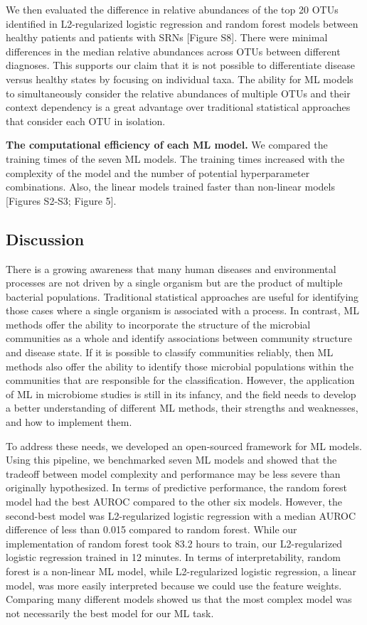 \documentclass[11pt,]{article}
\begin{document}
We then evaluated the difference in relative abundances of the top 20
OTUs identified in L2-regularized logistic regression and random forest
models between healthy patients and patients with SRNs {[}Figure S8{]}.
There were minimal differences in the median relative abundances across
OTUs between different diagnoses. This supports our claim that it is not
possible to differentiate disease versus healthy states by focusing on
individual taxa. The ability for ML models to simultaneously consider
the relative abundances of multiple OTUs and their context dependency is
a great advantage over traditional statistical approaches that consider
each OTU in isolation.

\textbf{The computational efficiency of each ML model.} We compared the
training times of the seven ML models. The training times increased with
the complexity of the model and the number of potential hyperparameter
combinations. Also, the linear models trained faster than non-linear
models {[}Figures S2-S3; Figure 5{]}.

\subsection{Discussion}\label{discussion}

There is a growing awareness that many human diseases and environmental
processes are not driven by a single organism but are the product of
multiple bacterial populations. Traditional statistical approaches are
useful for identifying those cases where a single organism is associated
with a process. In contrast, ML methods offer the ability to incorporate
the structure of the microbial communities as a whole and identify
associations between community structure and disease state. If it is
possible to classify communities reliably, then ML methods also offer
the ability to identify those microbial populations within the
communities that are responsible for the classification. However, the
application of ML in microbiome studies is still in its infancy, and the
field needs to develop a better understanding of different ML methods,
their strengths and weaknesses, and how to implement them.

To address these needs, we developed an open-sourced framework for ML
models. Using this pipeline, we benchmarked seven ML models and showed
that the tradeoff between model complexity and performance may be less
severe than originally hypothesized. In terms of predictive performance,
the random forest model had the best AUROC compared to the other six
models. However, the second-best model was L2-regularized logistic
regression with a median AUROC difference of less than 0.015 compared to
random forest. While our implementation of random forest took 83.2 hours
to train, our L2-regularized logistic regression trained in 12 minutes.
In terms of interpretability, random forest is a non-linear ML model,
while L2-regularized logistic regression, a linear model, was more
easily interpreted because we could use the feature weights. Comparing
many different models showed us that the most complex model was not
necessarily the best model for our ML task.
\end{document}
